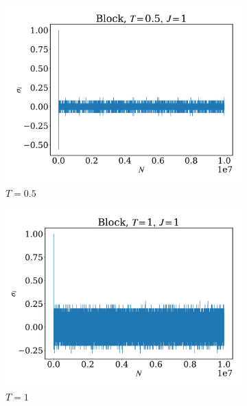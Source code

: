 \documentclass[12pt]{article}
\begin{document}
\begin{figure}
\begin{subfigure}[b]{0.49\textwidth}
		\includegraphics[width=\textwidth]{fig1DJ1N1e7/sig_b_T0.5J1.pdf}
		\caption{$T=0.5$}
	\end{subfigure}
	\begin{subfigure}[b]{0.49\textwidth}
		\centering
		\includegraphics[width=\textwidth]{fig1DJ1N1e7/sig_b_T1J1.pdf}
		\caption{$T=1$}
	\end{subfigure}
	\begin{subfigure}[b]{0.49\textwidth}
		\centering

\end{subfigure}
\end{figure}
\end{document}
